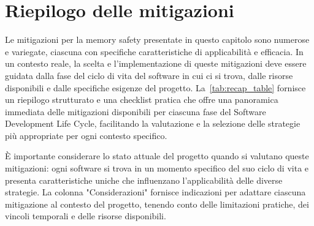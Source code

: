 \section{Riepilogo delle mitigazioni}
\label{sec:recap}

Le mitigazioni per la memory safety presentate in questo capitolo sono numerose e
variegate, ciascuna con specifiche caratteristiche di applicabilità e efficacia.
In un contesto reale, la scelta e l'implementazione di queste mitigazioni deve
essere guidata dalla fase del ciclo di vita del software in cui ci si trova, dalle
risorse disponibili e dalle specifiche esigenze del progetto. La~\autoref{tab:recap_table}
fornisce un riepilogo strutturato e una checklist pratica che offre una
panoramica immediata delle mitigazioni disponibili per ciascuna fase del
Software Development Life Cycle, facilitando la valutazione e la selezione delle
strategie più appropriate per ogni contesto specifico.

È importante considerare lo stato attuale del progetto quando si valutano queste
mitigazioni: ogni software si trova in un momento specifico del suo ciclo di
vita e presenta caratteristiche uniche che influenzano l'applicabilità delle
diverse strategie. La colonna "Considerazioni" fornisce indicazioni per adattare
ciascuna mitigazione al contesto del progetto, tenendo conto delle limitazioni
pratiche, dei vincoli temporali e delle risorse disponibili.

